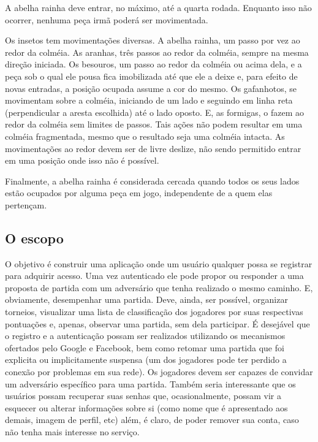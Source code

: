       A abelha rainha deve entrar, no máximo, até a quarta rodada. Enquanto isso não ocorrer, nenhuma peça irmã poderá ser movimentada.

      Os insetos tem movimentações diversas. A abelha rainha, um passo por vez ao redor da colméia. As aranhas, três passos ao redor da colméia, sempre na mesma direção iniciada. Os besouros, um passo ao redor da colméia ou acima dela, e a peça sob o qual ele pousa fica imobilizada até que ele a deixe e, para efeito de novas entradas, a posição ocupada assume a cor do mesmo. Os gafanhotos, se movimentam sobre a colméia, iniciando de um lado e seguindo em linha reta (perpendicular a aresta escolhida) até o lado oposto. E,  as formigas, o fazem ao redor da colméia sem limites de passos. Tais ações não podem resultar em uma colméia fragmentada, mesmo que o resultado seja uma colméia intacta. As movimentações ao redor devem ser de livre deslize, não sendo permitido entrar em uma posição onde isso não é possível.

      Finalmente, a abelha rainha é considerada cercada quando todos os seus lados estão ocupados por alguma peça em jogo, independente de a quem elas pertençam.

    \subsection{O escopo}

      O objetivo é construir uma aplicação onde um usuário qualquer possa se registrar para adquirir acesso. Uma vez autenticado ele pode propor ou responder a uma proposta de partida com um adversário que tenha realizado o mesmo caminho. E, obviamente, desempenhar uma partida. Deve, ainda, ser possível, organizar torneios, visualizar uma lista de classificação dos jogadores por suas respectivas pontuações e, apenas, observar uma partida, sem dela participar. É desejável que o registro e a autenticação possam ser realizados utilizando os mecanismos ofertados pelo Google e Facebook, bem como retomar uma partida que foi explicita ou implicitamente suspensa (um dos jogadores pode ter perdido a conexão por problemas em sua rede). Os jogadores devem ser capazes de convidar um adversário específico para uma partida. Também seria interessante que os usuários possam recuperar suas senhas que, ocasionalmente, possam vir a esquecer ou alterar informações sobre si (como nome que é apresentado aos demais, imagem de perfil, etc) além, é claro, de poder remover sua conta, caso não tenha mais interesse no serviço.

